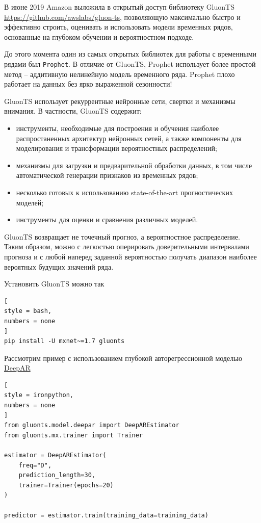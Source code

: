 \documentclass[%
	11pt,
	a4paper,
	utf8,
		]{article}
\begin{document}
В июне 2019 Amazon выложила в открытый доступ библиотеку GluonTS \url{https://github.com/awslabs/gluon-ts}, позволяющую максимально быстро и эффективно строить, оценивать и использовать модели временных рядов, основанные на глубоком обучении и вероятностном подходе.

До этого момента один из самых открытых библиотек для работы с временными рядами был \texttt{Prophet}. В отличие от GluonTS, Prophet использует более простой метод -- аддитивную нелинейную модель временного ряда. Prophet плохо работает на данных без ярко выраженной сезонности!

GluonTS использует рекуррентные нейронные сети, свертки и механизмы внимания. В частности, GluonTS содержит:
\begin{itemize}
	\item инструменты, необходимые для построения и обучения наиболее распростаненных архитектур нейронных сетей, а также компоненты для моделирования и трансформации вероятностных распределений;
	
	\item механизмы для загрузки и предварительной обработки данных, в том числе автоматической генерации признаков из временных рядов;
	
	\item несколько готовых к использованию state-of-the-art прогностических моделей;
	
	\item инструменты для оценки и сравнения различных моделей.
\end{itemize}

GluonTS возвращает не точечный прогноз, а вероятностное распределение. Таким образом, можно с легкостью оперировать доверительными интервалами прогноза и с любой наперед заданной вероятностью получать диапазон наиболее вероятных будущих значений ряда.

Установить GluonTS можно так
\begin{lstlisting}[
style = bash,
numbers = none
]
pip install -U mxnet~=1.7 gluonts
\end{lstlisting}

Рассмотрим пример с использованием глубокой авторегрессионной моделью \href{https://arxiv.org/abs/1704.04110}{DeepAR}
\begin{lstlisting}[
style = ironpython,
numbers = none
]
from gluonts.model.deepar import DeepAREstimator
from gluonts.mx.trainer import Trainer

estimator = DeepAREstimator(
    freq="D",
    prediction_length=30,
    trainer=Trainer(epochs=20)
)

predictor = estimator.train(training_data=training_data)
\end{lstlisting}
\end{document}

